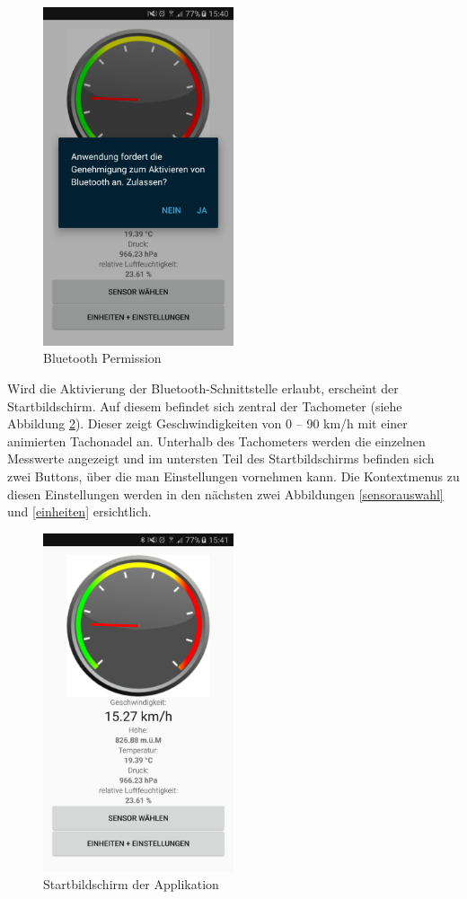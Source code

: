 \begin{figure}[ht]
    \includegraphics[width=0.5\textwidth]{4Resultate/imag/BLEBluetoothPermission.png} 
    \caption{Bluetooth Permission}
    \label{permission}
\end{figure}

Wird die Aktivierung der Bluetooth-Schnittstelle erlaubt, erscheint der Startbildschirm. Auf diesem befindet sich zentral der Tachometer (siehe Abbildung \ref{tacho}). Dieser zeigt Geschwindigkeiten von 0 – 90 km/h mit einer animierten Tachonadel an. Unterhalb des Tachometers werden die einzelnen Messwerte angezeigt und im untersten Teil des Startbildschirms befinden sich zwei Buttons, über die man Einstellungen vornehmen kann. Die Kontextmenus zu diesen Einstellungen werden in den nächsten zwei Abbildungen \ref{sensorauswahl} und \ref{einheiten} ersichtlich. 

\begin{figure}[ht]
    \includegraphics[width=0.5\textwidth]{4Resultate/imag/APPHomeScreen.png} 
    \caption{Startbildschirm der Applikation}
    \label{tacho}
\end{figure}

